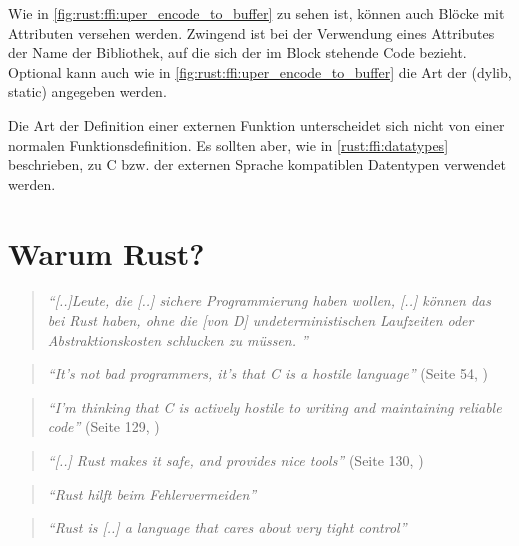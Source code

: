 Wie in \autoref{fig:rust:ffi:uper_encode_to_buffer} zu sehen ist, können auch  Blöcke mit Attributen versehen werden. Zwingend ist bei der Verwendung eines \rustcinline{#[link(..)]} Attributes der Name der Bibliothek, auf die sich der im  Block stehende Code bezieht. Optional kann auch wie in \autoref{fig:rust:ffi:uper_encode_to_buffer} die Art der  (dylib, static) angegeben werden.

Die Art der Definition einer externen Funktion unterscheidet sich nicht von einer normalen Funktionsdefinition. Es sollten aber, wie in \autoref{rust:ffi:datatypes} beschrieben, zu C bzw. der externen Sprache kompatiblen Datentypen verwendet werden.
 

\section{Warum Rust?}

\begin{quotation}
	\textit{\enquote{[..]Leute, die [..] sichere Programmierung haben wollen, [..] können das bei Rust haben, ohne die [von D] undeterministischen Laufzeiten oder Abstraktionskosten schlucken zu müssen. }}
	\cite{rust:fefe}
\end{quotation}




\begin{quotation}
	\textit{\enquote{It’s not bad programmers, it’s that C is a hostile language}} 
	(Seite 54, \cite{rust:c_is_hostile_mena})
\end{quotation}

\begin{quotation}
	\textit{\enquote{I’m thinking that C is actively hostile to writing and maintaining reliable code}} 
	(Seite 129, \cite{rust:c_is_hostile_mena})
\end{quotation}

\begin{quotation}
	\textit{\enquote{[..] Rust makes it safe, and  provides nice tools}} 
	(Seite 130, \cite{rust:c_is_hostile_mena})
\end{quotation}


\begin{quotation}
	\textit{\enquote{Rust hilft beim Fehlervermeiden}} 
	\cite{rust:c_is_hostile_golem}
\end{quotation}

\begin{quotation}
	\textit{\enquote{Rust is [..] a language that cares about very tight control}}
	\cite{rust:tight_control}
\end{quotation}

